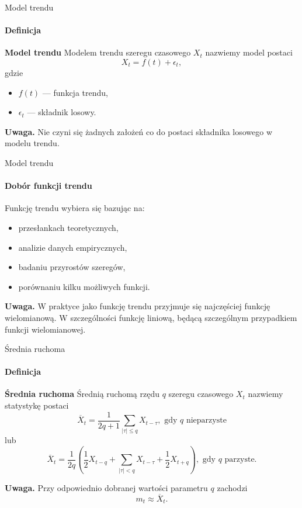 \documentclass[a4paper, 11pt]{beamer}
\begin{document}
	\begin{frame}{Model trendu}
		\framesubtitle{Definicja}
		\begin{block}{\textbf{Model trendu}}
			Modelem trendu szeregu czasowego $X_t$ nazwiemy model postaci \[
				X_t = f\left(t\right) + \epsilon_t,
			\]
			gdzie
			\begin{itemize}
				\item $f\left(t\right)$ --- funkcja trendu,
				\item $\epsilon_t$ --- składnik losowy.
			\end{itemize}
		\end{block}
		
		\begin{alert}{\textbf{Uwaga.}}
			Nie czyni się żadnych założeń co do postaci składnika losowego w modelu
			trendu.
		\end{alert}
	\end{frame}
	
	\begin{frame}{Model trendu}
		\framesubtitle{Dobór funkcji trendu}
		Funkcję trendu wybiera się bazując na:
		\begin{itemize}
			\item przesłankach teoretycznych,
			\item analizie danych empirycznych,
			\item badaniu przyrostów szeregów,
			\item porównaniu kilku możliwych funkcji.
		\end{itemize}
		\begin{alert}{\textbf{Uwaga.}}
			W praktyce jako funkcję trendu przyjmuje się najczęściej funkcję 
			wielomianową. W szczególności funkcję liniową, będącą szczególnym
			przypadkiem funkcji wielomianowej.
		\end{alert}
	\end{frame}
	
	\begin{frame}{Średnia ruchoma}
		\framesubtitle{Definicja}
		\begin{block}{\textbf{Średnia ruchoma}}
			Średnią ruchomą rzędu $q$ szeregu czasowego $X_t$ nazwiemy statystykę 
				postaci \[
				\overline{X}_t =
					\frac{1}{2q + 1} \sum_{\left|\tau\right| \leq q} X_{t-\tau},
				\mbox{ gdy }q\mbox{ nieparzyste}
			\]
			lub \[
				\overline{X}_t =
					\frac{1}{2q} \left(
						\frac{1}{2} X_{t-q} +
						\sum_{\left|\tau\right| < q} X_{t-\tau} +
						\frac{1}{2} X_{t+q}
					\right),
					\mbox{ gdy }q\mbox{ parzyste}.
			\]
		\end{block}
		\begin{alert}{\textbf{Uwaga.}}
			Przy odpowiednio dobranej wartości parametru $q$ zachodzi \[
				m_t \approx \overline{X}_t.
			\]
		\end{alert}
	\end{frame}
	
\end{document}
